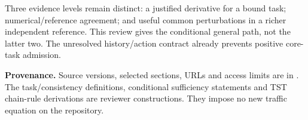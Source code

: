 \documentclass[11pt,a4paper]{article}
\begin{document}
Three evidence levels remain distinct: a justified derivative for a bound task;
numerical/reference agreement; and useful common perturbations in a richer
independent reference. This review gives the conditional general path, not the
latter two. The unresolved history/action contract already prevents positive
core-task admission.

\textbf{Provenance.} Source versions, selected sections, URLs and access limits are
in . The task/consistency definitions,
conditional sufficiency statements and TST chain-rule derivations are reviewer
constructions. They impose no new traffic equation on the repository.
\end{document}
